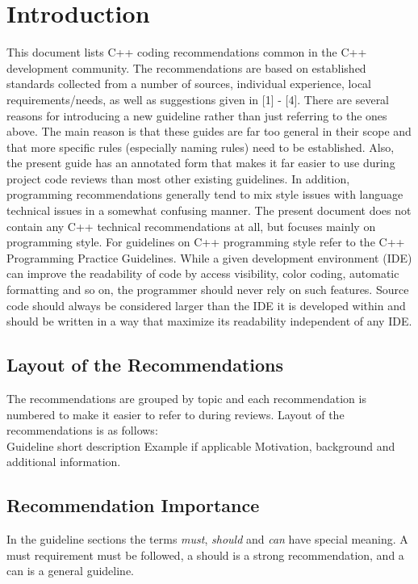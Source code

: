 \chapter{Introduction}
 This document lists C++ coding recommendations common in the C++ development community.
 The recommendations are based on established standards collected from a number of sources, individual experience, local requirements/needs, as well as suggestions given in [1] - [4].\newline
 There are several reasons for introducing a new guideline rather than just referring to the ones above. The main reason is that these guides are far too general in their scope and that more specific rules (especially naming rules) need to be established. Also, the present guide has an annotated form that makes it far easier to use during project code reviews than most other existing guidelines. In addition, programming recommendations generally tend to mix style issues with language technical issues in a somewhat confusing manner. The present document does not contain any C++ technical recommendations at all, but focuses mainly on programming style. For guidelines on C++ programming style refer to the C++ Programming Practice Guidelines.\newline
 While a given development environment (IDE) can improve the readability of code by access visibility, color coding, automatic formatting and so on, the programmer should never rely on such features. Source code should always be considered larger than the IDE it is developed within and should be written in a way that maximize its readability independent of any IDE.
 
 \section{Layout of the Recommendations}
 
 The recommendations are grouped by topic and each recommendation is numbered to make it easier to refer to during reviews.\newline
 Layout of the recommendations is as follows:\\[.5em]

\recommendation
{Guideline short description}
{Example if applicable}
{Motivation, background and additional information.}
\addtocounter{tabCounter}{-1}
\vspace{1cm}

\section{Recommendation Importance}
In the guideline sections the terms \textit{must}, \textit{should} and \textit{can} have special meaning. A must requirement must be followed, a should is a strong recommendation, and a can is a general guideline.

 